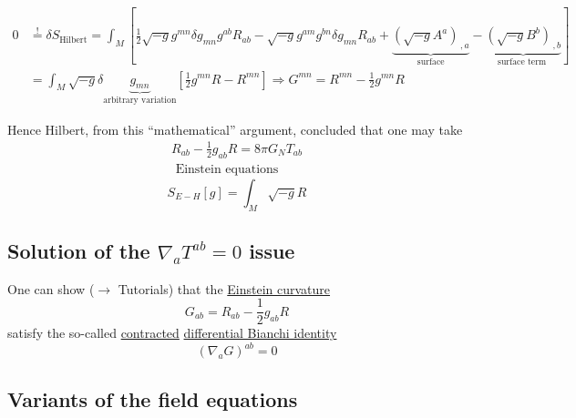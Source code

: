 \[
\begin{aligned}
  0 & \overset{!}{=} \delta S_{\text{Hilbert}} = \int_M [ \frac{1}{2} \sqrt{-g} g^{mn} \delta g_{mn} g^{ab} R_{ab} - \sqrt{-g} g^{am} g^{bn} \delta g_{mn} R_{ab}+    \underbrace{ (\sqrt{-g}A^a)_{ \, , a} }_{ \text{surface} } - \underbrace{ ( \sqrt{-g} B^b)_{ \, , b } }_{ \text{surface term } } ] \\
  & = \int_M \sqrt{-g} \delta \underbrace{g_{mn}}_{ \text{arbitrary variation}} [ \frac{1}{2} g^{mn} R - R^{mn} ] \Longrightarrow G^{mn} = R^{mn} - \frac{1}{2} g^{mn} R
\end{aligned}
\]

Hence Hilbert, from this ``mathematical'' argument, concluded that one may take
\[
\begin{gathered}
\boxed{ R_{ab} - \frac{1}{2} g_{ab} R = 8 \pi G_N T_{ab} }  \\
 \text{ Einstein equations}
\end{gathered}
\]
\[
S_{E-H}[g] = \int_M \sqrt{-g}R
\]

\subsection{Solution of the $\nabla_a T^{ab} =0$ issue}

One can show ($\to$ Tutorials) that the \underline{Einstein curvature}
\[
G_{ab} = R_{ab} - \frac{1}{2} g_{ab}R
\]
satisfy the so-called \underline{contracted} \underline{differential Bianchi identity}
\[
(\nabla_a G)^{ab} =0 
\]

\subsection{Variants of the field equations}

